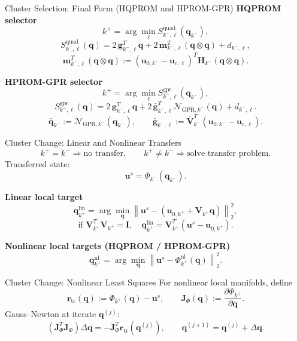 \documentclass{beamer}
\begin{document}
\begin{frame}{Cluster Selection: Final Form (HQPROM and HPROM-GPR)}
\scriptsize
\textbf{HQPROM selector}
\[
k^+=\arg\min_{\ell} S_{k^-,\ell}^{\mathrm{quad}}(\mathbf q_{k^-}),
\]
\[
S_{k^-,\ell}^{\mathrm{quad}}(\mathbf q)
=
2\,\mathbf g_{k^-,\ell}^T\mathbf q
+
2\,\mathbf m_{k^-,\ell}^T(\mathbf q\otimes\mathbf q)
+
d_{k^-,\ell},
\]
\[
\mathbf m_{k^-,\ell}^T(\mathbf q\otimes\mathbf q)
:=
(\mathbf u_{0,k^-}-\mathbf u_{c,\ell})^T\mathbf H_{k^-}(\mathbf q\otimes\mathbf q).
\]

\vspace{0.35em}
\textbf{HPROM-GPR selector}
\[
k^+=\arg\min_{\ell} S_{k^-,\ell}^{\mathrm{gpr}}(\mathbf q_{k^-}),
\]
\[
S_{k^-,\ell}^{\mathrm{gpr}}(\mathbf q)
=
2\,\mathbf g_{k^-,\ell}^T\mathbf q
+
2\,\bar{\mathbf g}_{k^-,\ell}^T\mathcal N_{\mathrm{GPR},k^-}(\mathbf q)
+
d_{k^-,\ell}.
\]
\[
\bar{\mathbf q}_{k^-}:=\mathcal N_{\mathrm{GPR},k^-}(\mathbf q_{k^-}),
\qquad
\bar{\mathbf g}_{k^-,\ell}:=\bar{\mathbf V}_{k^-}^T(\mathbf u_{0,k^-}-\mathbf u_{c,\ell}).
\]
\end{frame}

\begin{frame}{Cluster Change: Linear and Nonlinear Transfers}
\scriptsize
\[
k^+=k^- \Rightarrow \text{no transfer},
\qquad
k^+\neq k^- \Rightarrow \text{solve transfer problem}.
\]
Transferred state:
\[
\mathbf u^s=\Phi_{k^-}(\mathbf q_{k^-}).
\]

\textbf{Linear local target}
\[
\mathbf q_{k^+}^{\mathrm{lin}}
=\arg\min_{\mathbf q}
\left\|
\mathbf u^s-\left(\mathbf u_{0,k^+}+\mathbf V_{k^+}\mathbf q\right)
\right\|_2^2,
\]
\[
\text{if }\mathbf V_{k^+}^T\mathbf V_{k^+}=\mathbf I,\quad
\mathbf q_{k^+}^{\mathrm{lin}}=\mathbf V_{k^+}^T(\mathbf u^s-\mathbf u_{0,k^+}).
\]

\textbf{Nonlinear local targets (HQPROM / HPROM-GPR)}
\[
\mathbf q_{k^+}^{\mathrm{nl}}
=\arg\min_{\mathbf q}
\left\|\mathbf u^s-\Phi_{k^+}^{\mathrm{nl}}(\mathbf q)\right\|_2^2.
\]
\end{frame}

\begin{frame}{Cluster Change: Nonlinear Least Squares}
\small
For nonlinear local manifolds, define
\[
\mathbf r_{\mathrm{tr}}(\mathbf q):=\Phi_{k^+}(\mathbf q)-\mathbf u^s,
\qquad
\mathbf J_{\Phi}(\mathbf q):=\frac{\partial \Phi_{k^+}}{\partial \mathbf q}.
\]
Gauss--Newton at iterate $\mathbf q^{(j)}$:
\[
\left(\mathbf J_{\Phi}^T\mathbf J_{\Phi}\right)\Delta\mathbf q
=
-\mathbf J_{\Phi}^T\mathbf r_{\mathrm{tr}}(\mathbf q^{(j)}),
\qquad
\mathbf q^{(j+1)}=\mathbf q^{(j)}+\Delta\mathbf q.
\]
\end{frame}
\end{document}
